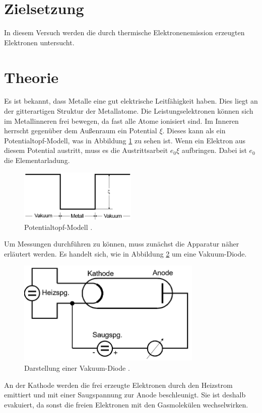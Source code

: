 \section{Zielsetzung}
In diesem Versuch werden die durch thermische Elektronenemission erzeugten Elektronen untersucht.
\section{Theorie}
Es ist bekannt, dass Metalle eine gut elektrische Leitfähigkeit haben. Dies liegt an der gitterartigen Struktur der Metallatome.
Die Leistungselektronen können sich im Metallinneren frei bewegen, da fast alle Atome ionisiert sind. Im Inneren herrscht gegenüber dem
Außenraum ein Potential $\xi$.
Dieses kann als ein Potentialtopf-Modell, was in Abbildung \ref{abb:1} zu sehen ist. Wenn ein Elektron aus diesem Potential austritt, muss
es die Austrittsarbeit $e_0 \xi$ aufbringen. Dabei ist $e_0$ die Elementarladung.
\begin{figure}[H]
  \centering
  \includegraphics[width=5 cm, height= 2.5cm]{content/Potentialtopf.png}
  \caption{Potentialtopf-Modell \cite{1}.}
  \label{abb:1}
\end{figure}
Um Messungen durchführen zu können, muss zunächst die Apparatur näher erläutert werden.
Es handelt sich, wie in  Abbildung \ref{abb:2} um eine Vakuum-Diode.
\begin{figure}[H]
  \centering
  \includegraphics[width=10 cm, height =5cm]{content/Aufbau.png}
  \caption{Darstellung einer Vakuum-Diode \cite{1}.}
  \label{abb:2}
\end{figure}
An der Kathode werden die frei erzeugte Elektronen durch den Heizstrom emittiert und mit einer Saugspannung zur
Anode beschleunigt. Sie ist deshalb evakuiert, da sonst die freien Elektronen mit den Gasmolekülen wechselwirken.
